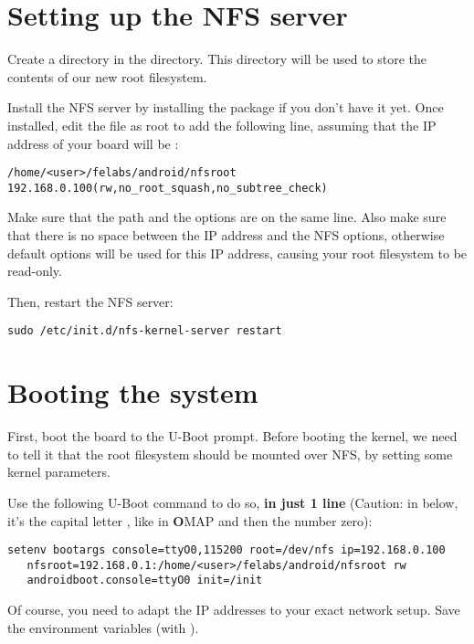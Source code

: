 \section{Setting up the NFS server}

Create a  directory in the 
directory. This  directory will be used to store the
contents of our new root filesystem.

Install the NFS server by installing the 
package if you don't have it yet. Once installed, edit the
 file as root to add the following line, assuming that the
IP address of your board will be :

\footnotesize
\begin{verbatim}
/home/<user>/felabs/android/nfsroot 192.168.0.100(rw,no_root_squash,no_subtree_check)
\end{verbatim}
\normalsize

Make sure that the path and the options are on the same line.
Also make sure that there is no space between the IP address and the NFS
options, otherwise default options will be used for this IP address,
causing your root filesystem to be read-only.

Then, restart the NFS server:

\begin{verbatim}
sudo /etc/init.d/nfs-kernel-server restart
\end{verbatim}

\section{Booting the system}

First, boot the board to the U-Boot prompt. Before booting the kernel,
we need to tell it that the root filesystem should be mounted over
NFS, by setting some kernel parameters.

Use the following U-Boot command to do so, {\bf in just 1 line}
(Caution: in  below, it's the capital letter , like in
{\bf O}MAP and then the number zero):

\begin{verbatim}
setenv bootargs console=ttyO0,115200 root=/dev/nfs ip=192.168.0.100
   nfsroot=192.168.0.1:/home/<user>/felabs/android/nfsroot rw
   androidboot.console=ttyO0 init=/init
\end{verbatim}

Of course, you need to adapt the IP addresses to your exact network
setup. Save the environment variables (with ).

